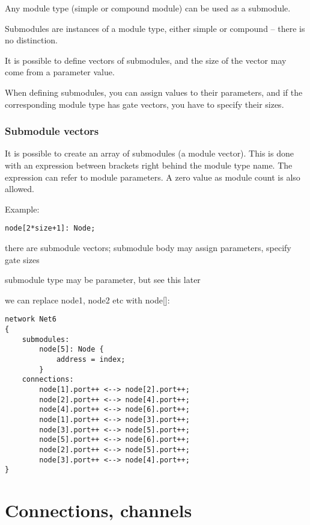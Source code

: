 Any module type (simple or compound module) can be
used as a submodule.

Submodules are instances of a module type, either simple
or compound -- there is no distinction.

It is possible to define vectors of submodules, and the
size of the vector may come from a parameter value.

When defining submodules, you can assign values to their
parameters, and if the corresponding module type has gate vectors,
you have to specify their sizes.


\subsubsection{Submodule vectors}

It is possible to create an array of
submodules (a module
vector).  This is done with an expression between
brackets right behind the module type name. The expression can refer
to module parameters. A zero value as module count is also allowed.

Example:

\begin{Verbatim}[commandchars=\\\{\}]
    node[2*size+1]: Node;
\end{Verbatim}

there are submodule vectors;
submodule body may assign parameters, specify gate sizes

submodule type may be parameter, but see this later

we can replace node1, node2 etc with node[]:

\begin{Verbatim}
network Net6
{
    submodules:
        node[5]: Node {
            address = index;
        }
    connections:
        node[1].port++ <--> node[2].port++;
        node[2].port++ <--> node[4].port++;
        node[4].port++ <--> node[6].port++;
        node[1].port++ <--> node[3].port++;
        node[3].port++ <--> node[5].port++;
        node[5].port++ <--> node[6].port++;
        node[2].port++ <--> node[5].port++;
        node[3].port++ <--> node[4].port++;
}
\end{Verbatim}


\section{Connections, channels}

